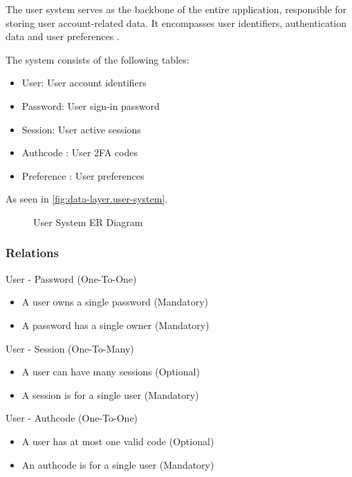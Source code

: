 The user system serves as the backbone of the entire application, responsible for
storing user account-related data. It encompasses user identifiers, authentication
data and user preferences \textdagger{}.

The system consists of the following tables:

\begin{itemize}
	\item User: User account identifiers

	\item Password: User sign-in password

	\item Session: User active sessions

	\item Authcode \textdagger{}: User 2FA codes

	\item Preference \textdagger{}: User preferences
\end{itemize}

As seen in \autoref{fig:data-layer.user-system}.

\begin{figure}[h]
	\centering
	
	\caption{User System ER Diagram}
	\label{fig:data-layer.user-system}
\end{figure}

\subsubsection{Relations}
\label{data-layer.design.user.rels}

User - Password (One-To-One)
\begin{itemize}
	\item A user owns a single password (Mandatory)

	\item A password has a single owner (Mandatory)
\end{itemize}

User - Session (One-To-Many)
\begin{itemize}
	\item A user can have many sessions (Optional)

	\item A session is for a single user (Mandatory)
\end{itemize}

User - Authcode (One-To-One) \textdagger{}
\begin{itemize}
	\item A user has at most one valid code (Optional)

	\item An authcode is for a single user (Mandatory)
\end{itemize}

